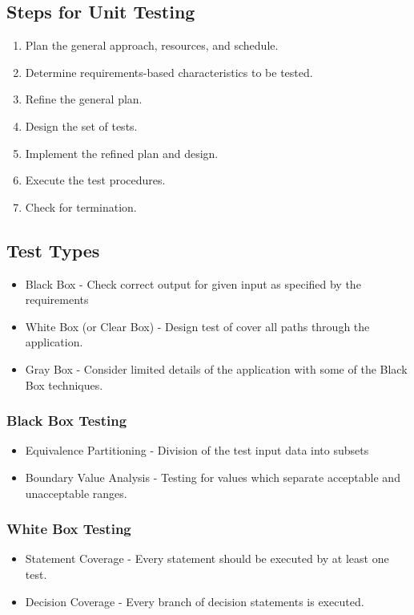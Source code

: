 \documentclass{report}
\begin{document}
			\subsection{Steps for Unit Testing}
				\begin{enumerate}
					\item Plan the general approach, resources, and schedule.
					\item Determine requirements-based characteristics to be tested.
					\item Refine the general plan.
					\item Design the set of tests.
					\item Implement the refined plan and design.
					\item Execute the test procedures.
					\item Check for termination.
				\end{enumerate}
			\subsection{Test Types}
				\begin{itemize}
					\item Black Box - Check correct output for given input as specified by the requirements
					\item White Box (or Clear Box) - Design test of cover all paths through the application.
					\item Gray Box - Consider limited details of the application with some of the Black Box techniques.
				\end{itemize}
				\subsubsection{Black Box Testing}
					\begin{itemize}
						\item Equivalence Partitioning - Division of the test input data into subsets
						\item Boundary Value Analysis - Testing for values which separate acceptable and unacceptable ranges.
					\end{itemize}
				\subsubsection{White Box Testing}
					\begin{itemize}
						\item Statement Coverage - Every statement should be executed by at least one test.
						\item Decision Coverage - Every branch of decision statements is executed.
					\end{itemize}
\end{document}
